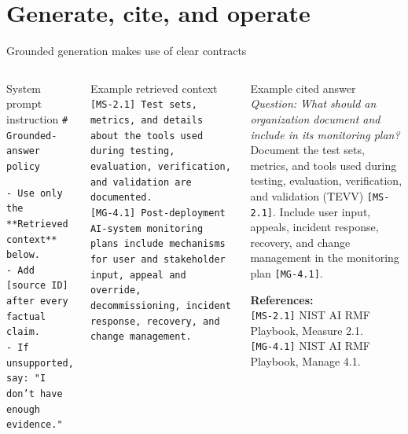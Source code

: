 \documentclass[aspectratio=169]{beamer}
\begin{document}
\section{Generate, cite, and operate}
\begin{frame}{Grounded generation makes use of clear contracts}
\small
\begin{columns}[t]
\begin{block}{System prompt instruction}
\scriptsize
\texttt{\# Grounded-answer policy}\par\vspace{-.15em}
\texttt{- Use only the **Retrieved context** below.}\\
\texttt{- Add [source ID] after every factual claim.}\\
\texttt{- If unsupported, say: "I don't have enough evidence."}
\end{block}
\begin{block}{Example retrieved context}
\scriptsize
\texttt{[MS-2.1] Test sets, metrics, and details about the tools used during testing, evaluation, verification, and validation are documented.}\\[.35em]
\texttt{[MG-4.1] Post-deployment AI-system monitoring plans include mechanisms for user and stakeholder input, appeal and override, decommissioning, incident response, recovery, and change management.}
\end{block}
\begin{block}{Example cited answer}
\footnotesize
\textit{Question: What should an organization document and include in its monitoring plan?}\\[.35em]
Document the test sets, metrics, and tools used during testing, evaluation, verification, and validation (TEVV) \texttt{[MS-2.1]}. Include user input, appeals, incident response, recovery, and change management in the monitoring plan \texttt{[MG-4.1]}.
\par\vspace{.45em}
\scriptsize\textbf{References:} \\
\texttt{[MS-2.1]} NIST AI RMF Playbook, Measure 2.1.\\
\texttt{[MG-4.1]} NIST AI RMF Playbook, Manage 4.1.
\end{block}
\end{columns}
\end{frame}
\end{document}
